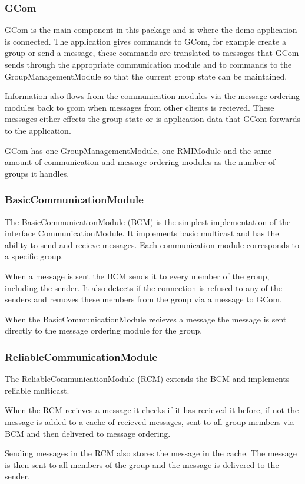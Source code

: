 \documentclass[english]{article}
\begin{document}
\subsubsection{GCom}
GCom is the main component in this package and is where the demo application is connected. The application gives commands to GCom, for example create a group or send a message, these commands are translated to messages that GCom sends through the appropriate communication module and to commands to the GroupManagementModule so that the current group state can be maintained.

Information also flows from the communication modules via the message ordering modules back to gcom when messages from other clients is recieved. These messages either effects the group state or is application data that GCom forwards to the application. 

GCom has one GroupManagementModule, one RMIModule and the same amount of communication and message ordering modules as the number of groups it handles.

\subsubsection{BasicCommunicationModule}
The BasicCommunicationModule (BCM) is the simplest implementation of the interface CommunicationModule. It implements basic multicast and has the ability to send and recieve messages. Each communication module corresponds to a specific group. 

When a message is sent the BCM sends it to every member of the group, including the sender. It also detects if the connection is refused to any of the senders and removes these members from the group via a message to GCom.

When the BasicCommunicationModule recieves a message the message is sent directly to the message ordering module for the group.

\subsubsection{ReliableCommunicationModule}
The ReliableCommunicationModule (RCM) extends the BCM and implements reliable multicast.

When the RCM recieves a message it checks if it has recieved it before, if not the message is added to a cache of recieved messages, sent to all group members via BCM and then delivered to message ordering.

Sending messages in the RCM also stores the message in the cache. The message is then sent to all members of the group and the message is delivered to the sender.
\end{document}
